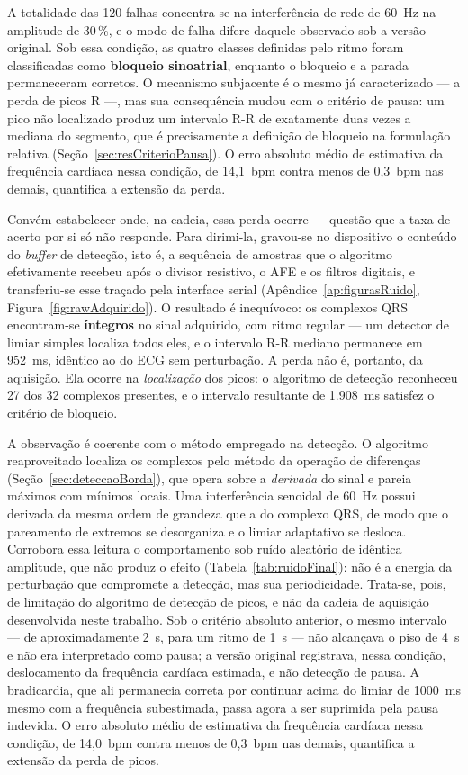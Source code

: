 A totalidade das 120 falhas concentra-se na interferência de rede de 60~Hz na amplitude de
30\,\%, e o modo de falha difere daquele observado sob a versão original. Sob essa condição,
as quatro classes definidas pelo ritmo foram classificadas como \textbf{bloqueio
sinoatrial}, enquanto o bloqueio e a parada permaneceram corretos. O mecanismo subjacente é o
mesmo já caracterizado --- a perda de picos R ---, mas sua consequência mudou com o critério
de pausa: um pico não localizado produz um intervalo R-R de exatamente duas vezes a mediana
do segmento, que é precisamente a definição de bloqueio na formulação relativa
(Seção~\ref{sec:resCriterioPausa}). O erro absoluto médio de estimativa da frequência
cardíaca nessa condição, de 14,1~bpm contra menos de 0,3~bpm nas demais, quantifica a
extensão da perda.

Convém estabelecer onde, na cadeia, essa perda ocorre --- questão que a taxa de acerto por si só não responde. Para dirimi-la, gravou-se no dispositivo o conteúdo do \textit{buffer} de detecção, isto é, a sequência de amostras que o algoritmo efetivamente recebeu após o divisor resistivo, o \acs{AFE} e os filtros digitais, e transferiu-se esse traçado pela interface serial (Apêndice~\ref{ap:figurasRuido}, Figura~\ref{fig:rawAdquirido}). O resultado é inequívoco: os complexos QRS encontram-se \textbf{íntegros} no sinal adquirido, com ritmo regular --- um detector de limiar simples localiza todos eles, e o intervalo R-R mediano permanece em 952~ms, idêntico ao do \acs{ECG} sem perturbação. A perda não é, portanto, da aquisição. Ela ocorre na \emph{localização} dos picos: o algoritmo de detecção reconheceu 27 dos 32 complexos presentes, e o intervalo resultante de 1.908~ms satisfez o critério de bloqueio.

A observação é coerente com o método empregado na detecção. O algoritmo reaproveitado localiza os complexos pelo método da operação de diferenças (Seção~\ref{sec:deteccaoBorda}), que opera sobre a \emph{derivada} do sinal e pareia máximos com mínimos locais. Uma interferência senoidal de 60~Hz possui derivada da mesma ordem de grandeza que a do complexo QRS, de modo que o pareamento de extremos se desorganiza e o limiar adaptativo se desloca. Corrobora essa leitura o comportamento sob ruído aleatório de idêntica amplitude, que não produz o efeito (Tabela~\ref{tab:ruidoFinal}): não é a energia da perturbação que compromete a detecção, mas sua periodicidade. Trata-se, pois, de limitação do algoritmo de detecção de picos, e não da cadeia de aquisição desenvolvida neste trabalho. Sob o critério absoluto anterior, o mesmo intervalo --- de aproximadamente 2~s, para um ritmo de 1~s --- não alcançava o piso de 4~s e não era interpretado como pausa; a versão original registrava, nessa condição, deslocamento da frequência cardíaca estimada, e não detecção de pausa. A bradicardia, que ali permanecia correta por continuar acima do limiar de 1000~ms mesmo com a frequência subestimada, passa agora a ser suprimida pela pausa indevida. O erro absoluto médio de estimativa da frequência cardíaca nessa condição, de 14,0~bpm contra menos de 0,3~bpm nas demais, quantifica a extensão da perda de picos.

